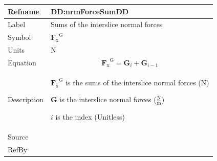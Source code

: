 \documentclass[12pt]{article}
\begin{document}
\medskip
\noindent
\begin{minipage}{\textwidth}
\begin{tabular}{>{\raggedright}p{}>{\raggedright\arraybackslash}p{}}
\toprule \textbf{Refname} & \textbf{DD:nrmForceSumDD}
\label{DD:nrmForceSumDD}
\\ \midrule
Label & Sums of the interslice normal forces
        
\\ \midrule
Symbol & ${{\symbf{F}_{\text{x}}}^{\text{G}}}$
         
\\ \midrule
Units & ${\text{N}}$
        
\\ \midrule
Equation & \begin{displaymath}
           {{\symbf{F}_{\text{x}}}^{\text{G}}}={\symbf{G}}_{i}+{\symbf{G}}_{i-1}
           \end{displaymath}
\\ \midrule
Description & \begin{symbDescription}
              \item{${{\symbf{F}_{\text{x}}}^{\text{G}}}$ is the sums of the interslice normal forces (${\text{N}}$)}
              \item{$\symbf{G}$ is the interslice normal forces ($\frac{\text{N}}{\text{m}}$)}
              \item{$i$ is the index (Unitless)}
              \end{symbDescription}
\\ \midrule
Source & \cite{fredlund1977}
         
\\ \midrule
RefBy & 
\\ \bottomrule
\end{tabular}
\end{minipage}
\end{document}
